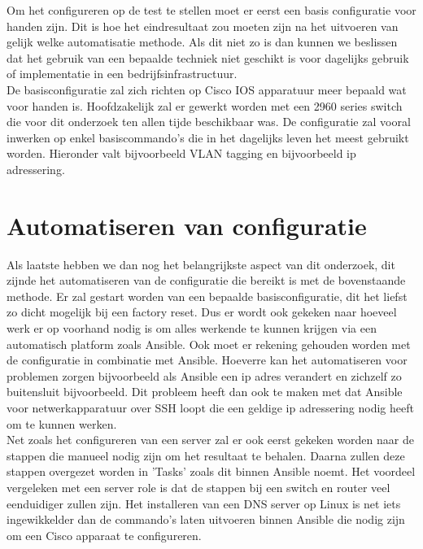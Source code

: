 Om het configureren op de test te stellen moet er eerst een basis configuratie voor handen zijn. Dit is hoe het eindresultaat zou moeten zijn na het uitvoeren van gelijk welke automatisatie methode. Als dit niet zo is dan kunnen we beslissen dat het gebruik van een bepaalde techniek niet geschikt is voor dagelijks gebruik of implementatie in een bedrijfsinfrastructuur.
\\

De basisconfiguratie zal zich richten op Cisco IOS apparatuur meer bepaald wat voor handen is. Hoofdzakelijk zal er gewerkt worden met een 2960 series switch die voor dit onderzoek ten allen tijde beschikbaar was. De configuratie zal vooral inwerken op enkel basiscommando's die in het dagelijks leven het meest gebruikt worden. Hieronder valt bijvoorbeeld VLAN tagging en bijvoorbeeld ip adressering. 

\section{Automatiseren van configuratie}
\label{ch:automatiseren}

Als laatste hebben we dan nog het belangrijkste aspect van dit onderzoek, dit zijnde het automatiseren van de configuratie die bereikt is met de bovenstaande methode. Er zal gestart worden van een bepaalde basisconfiguratie, dit het liefst zo dicht mogelijk bij een factory reset. Dus er wordt ook gekeken naar hoeveel werk er op voorhand nodig is om alles werkende te kunnen krijgen via een automatisch platform zoals Ansible. Ook moet er rekening gehouden worden met de configuratie in combinatie met Ansible. Hoeverre kan het automatiseren voor problemen zorgen bijvoorbeeld als Ansible een ip adres verandert en zichzelf zo buitensluit bijvoorbeeld. Dit probleem heeft dan ook te maken met dat Ansible voor netwerkapparatuur over SSH loopt die een geldige ip adressering nodig heeft om te kunnen werken.
\\

Net zoals het configureren van een server zal er ook eerst gekeken worden naar de stappen die manueel nodig zijn om het resultaat te behalen. Daarna zullen deze stappen overgezet worden in 'Tasks' zoals dit binnen Ansible noemt. Het voordeel vergeleken met een server role is dat de stappen bij een switch en router veel eenduidiger zullen zijn. Het installeren van een DNS server op Linux is net iets ingewikkelder dan de commando's laten uitvoeren binnen Ansible die nodig zijn om een Cisco apparaat te configureren.


